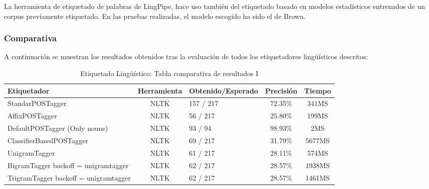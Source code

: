 \documentclass[runningheads,a4paper]{llncs}
\theoremstyle{break}
\newcommand{\rowstyle}[1]{\gdef\currentrowstyle{#1}%
  #1\ignorespaces
}
\begin{document}
La herramienta de etiquetado de palabras de LingPipe, hace uso también del etiquetado basado en modelos estadísticos entrenados de un corpus previamente etiquetado. En las pruebas realizadas, el modelo escogido ha sido el de Brown.

\subsubsection{Comparativa}
\textbf{}

A continuación se muestran los resultados obtenidos tras la evaluación de todos los etiquetadores lingüísticos descritos:

\bgroup
\setlength{\tabcolsep}{10pt}
\def\arraystretch{1.5}
\begin{table}
\begin{tabular}{p{4cm}|c|p{2.5cm}|c|c}
\rowstyle{\bfseries} Etiquetador &  \rowstyle{\bfseries} Herramienta & \rowstyle{\bfseries} Obtenido/\newline Esperado & \rowstyle{\bfseries} Precisión & \rowstyle{\bfseries} Tiempo\\ \hline
StandarPOSTagger 			  & NLTK & 157 / 217 & 72.35\% & 341MS \\
AffixPOSTagger 				  & NLTK & 56  / 217 & 25.80\% & 199MS \\
DefaultPOSTagger (Only nouns) & NLTK & 93  / 94  & 98.93\% & 2MS \\
ClassifierBasedPOSTagger 	  & NLTK & 69  / 217 & 31.79\% & 5677MS \\
UnigramTagger                 & NLTK & 61  / 217 & 28.11\% & 574MS \\
BigramTagger backoff = unigramtagger & NLTK & 62 / 217 & 28.57\% & 1938MS \\
TrigramTagger backoff = unigramtagger  & NLTK & 62 / 217 & 28.57\% & 1461MS \\ \hline
\end{tabular}
\textbf{}\\
\caption{Etiquetado Lingüístico: Tabla comparativa de resultados I}
\end{table}
\egroup
\end{document}

